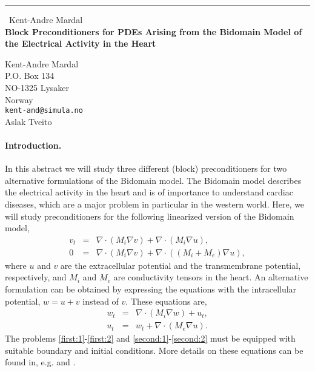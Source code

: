 \documentclass{report}
\begin{document}
\begin{center}
\rule{6in}{1pt} \
{\large Kent-Andre Mardal \\
{\bf Block Preconditioners for PDEs Arising from the Bidomain Model of the Electrical Activity in the Heart}}

Kent-Andre Mardal \\ P.O. Box 134 \\ NO-1325 Lysaker \\ Norway
\\
{\tt kent-and@simula.no}\\
Aslak Tveito\end{center}


\renewcommand{\AA}{\mathcal{A}}
\newcommand{\BB}{\mathcal{B}}
\newcommand{\xx}{\mathcal{x}}
\newcommand{\bb}{\mathcal{b}}

\paragraph{Introduction.}

In this abstract we will study three different (block) preconditioners for
two alternative formulations of the Bidomain model.
The Bidomain model describes the electrical activity in
the heart and is of importance to understand cardiac
diseases, which are a major problem in particular in
the western world. Here, we will study preconditioners
for the following linearized version of the Bidomain model,
\begin{eqnarray}
\label{first:1}
v_t &=& \nabla\cdot(M_i\nabla v)+\nabla\cdot(M_i\nabla u),\\
\label{first:2}
0 &=& \nabla\cdot(M_i\nabla v)+\nabla\cdot((M_i+M_e)\nabla u),
\end{eqnarray}
where $u$ and $v$ are the extracellular potential and the transmembrane
potential, respectively,
and $M_i$ and $M_e$ are conductivity tensors in the heart.
An alternative formulation can be obtained by expressing the
equations with the intracellular potential, $w = u +v $ instead of $v$.
These equations are,
\begin{eqnarray}
\label{second:1}
w_t &=& \nabla\cdot(M_i\nabla w)+ u_t ,\\
\label{second:2}
u_t &=& w_t+\nabla\cdot(M_e\nabla u).
\end{eqnarray}
The problems \eqref{first:1}-\eqref{first:2}
and \eqref{second:1}-\eqref{second:2} must
be equipped with suitable boundary and initial
conditions.
More details on these equations can
be found in, e.g. \cite{Pennacchio} and \cite{block-mg}.
\end{document}
